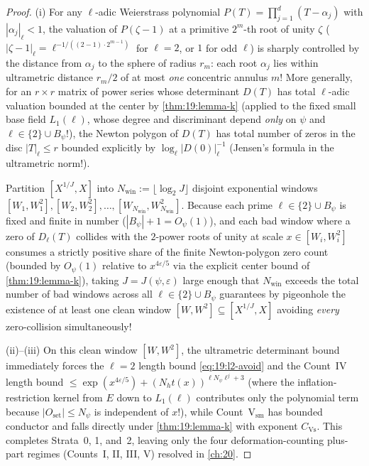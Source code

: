 \begin{proof}
(i) For any $\ell$-adic Weierstrass polynomial $P(T) = \prod_{j=1}^d (T - \alpha_j)$ with $|\alpha_j|_\ell < 1$, the valuation of $P(\zeta - 1)$ at a primitive $2^m$-th root of unity $\zeta$ ($|\zeta - 1|_\ell = \ell^{-1/((2-1)\cdot 2^{m-1})}$ for $\ell = 2$, or $1$ for odd $\ell$) is sharply controlled by the distance from $\alpha_j$ to the sphere of radius $r_m$: each root $\alpha_j$ lies within ultrametric distance $r_m / 2$ of at most \emph{one} concentric annulus $m$! More generally, for an $r \times r$ matrix of power series whose determinant $D(T)$ has total $\ell$-adic valuation bounded at the center by \cref{thm:19:lemma-k} (applied to the fixed small base field $L_1(\ell)$, whose degree and discriminant depend \emph{only} on $\psi$ and $\ell \in \{2\} \cup B_\psi$!), the Newton polygon of $D(T)$ has total number of zeros in the disc $|T|_\ell \le r$ bounded explicitly by $\log_\ell|D(0)|_\ell^{-1}$ (Jensen's formula in the ultrametric norm!).

Partition $[X^{1/J}, X]$ into $N_{\mathrm{win}} := \lfloor \log_2 J \rfloor$ disjoint exponential windows $[W_1, W_1^2], [W_2, W_2^2], \dots, [W_{N_{\mathrm{win}}}, W_{N_{\mathrm{win}}}^2]$. Because each prime $\ell \in \{2\} \cup B_\psi$ is fixed and finite in number ($|B_\psi| + 1 = O_\psi(1)$), and each bad window where a zero of $D_\ell(T)$ collides with the $2$-power roots of unity at scale $x \in [W_i, W_i^2]$ consumes a strictly positive share of the finite Newton-polygon zero count (bounded by $O_\psi(1)$ relative to $x^{4\varepsilon/5}$ via the explicit center bound of \cref{thm:19:lemma-k}), taking $J = J(\psi, \varepsilon)$ large enough that $N_{\mathrm{win}}$ exceeds the total number of bad windows across all $\ell \in \{2\} \cup B_\psi$ guarantees by pigeonhole the existence of at least one clean window $[W, W^2] \subseteq [X^{1/J}, X]$ avoiding \emph{every} zero-collision simultaneously!

(ii)--(iii) On this clean window $[W, W^2]$, the ultrametric determinant bound immediately forces the $\ell = 2$ length bound \eqref{eq:19:l2-avoid} and the Count~IV length bound $\le \exp(x^{4\varepsilon/5}) + (N_h t(x))^{\ell N_\psi \ell^j + 3}$ (where the inflation-restriction kernel from $E$ down to $L_1(\ell)$ contributes only the polynomial term because $|O_{\mathrm{set}}| \le N_\psi$ is independent of $x$!), while Count~$\mathrm{V}_{\mathrm{sm}}$ has bounded conductor and falls directly under \cref{thm:19:lemma-k} with exponent $C_{\mathrm{Vs}}$. This completes Strata~0, 1, and~2, leaving only the four deformation-counting plus-part regimes (Counts~I, II, III, V) resolved in \cref{ch:20}.
\end{proof}
